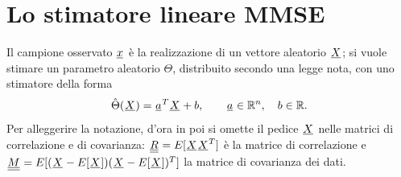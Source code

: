 \section{Lo stimatore lineare MMSE}

Il campione osservato $\vett{x}$ è la realizzazione di un vettore aleatorio $\vett{X}$; si vuole stimare un parametro
aleatorio $\Theta$, distribuito secondo una legge nota, con uno stimatore della forma
\[ \hat\Theta(\vett{X}) = \vett{a}^T \vett{X} + b , \qquad \vett{a} \in \R^n , \quad b \in \R . \]
Per alleggerire la notazione, d'ora in poi si omette il pedice $\vett{X}$ nelle matrici di correlazione e di
covarianza: $\matr{R} = E[\vett{X}\vett{X}^T]$ è la matrice di correlazione e $\matr{M} = E[(\vett{X} -
E[\vett{X}])(\vett{X} - E[\vett{X}])^T]$ la matrice di covarianza dei dati.



